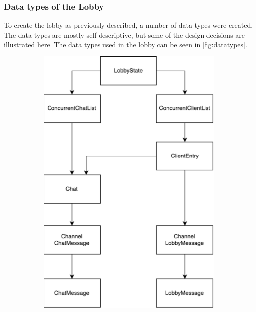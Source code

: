 \documentclass[a4paper]{article}
\begin{document}
\subsubsection{Data types of the Lobby}
To create the lobby as previously described, a number of data types were created. The data types are mostly self-descriptive, but some of the design decisions are illustrated here. The data types used in the lobby can be seen in \cref{fig:datatypes}.

\begin{figure}[h!]
    \centering
    \begin{subfigure}{\textwidth}
        \centering
        \includegraphics[scale=0.4]{figure/datatypes}
    

\end{subfigure}
\end{figure}
\end{document}
